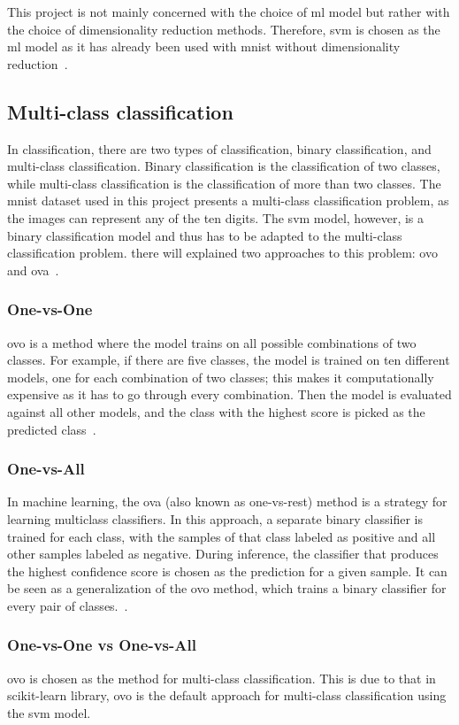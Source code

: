 This project is not mainly concerned with the choice of \gls{ml} model but rather with the choice of dimensionality reduction methods. Therefore, \gls{svm} is chosen as the \gls{ml} model as it has already been used with \gls{mnist} without dimensionality reduction~\cite{lecun-mnist-database}.



\subsection{Multi-class classification}\label{subsec:multi-class}
In classification, there are two types of classification, binary classification, and multi-class classification. Binary classification is the classification of two classes, while multi-class classification is the classification of more than two classes. The \gls{mnist} dataset used in this project presents a multi-class classification problem, as the images can represent any of the ten digits. The \gls{svm} model, however, is a binary classification model and thus has to be adapted to the multi-class classification problem. there will explained two approaches to this problem: \gls{ovo} and \gls{ova}~\cite{james-statistical-learning1}.

\subsubsection{One-vs-One}\label{subsubsec:one-vs-one}
\gls{ovo} is a method where the model trains on all possible combinations of two classes. For example, if there are five classes, the model is trained on ten different models, one for each combination of two classes; this makes it computationally expensive as it has to go through every combination. Then the model is evaluated against all other models, and the class with the highest score is picked as the predicted class~\cite{james-statistical-learning1}.

\subsubsection{One-vs-All}\label{subsubsec:one-vs-all}
In machine learning, the \gls{ova} (also known as one-vs-rest) method is a strategy for learning multiclass classifiers. In this approach, a separate binary classifier is trained for each class, with the samples of that class labeled as positive and all other samples labeled as negative. During inference, the classifier that produces the highest confidence score is chosen as the prediction for a given sample. It can be seen as a generalization of the \gls{ovo} method, which trains a binary classifier for every pair of classes.~\cite{james-statistical-learning1}.

\subsubsection{One-vs-One vs One-vs-All}\label{subsubsec:one-vs-one-vs-one-vs-all}
\gls{ovo} is chosen as the method for multi-class classification. This is due to that in scikit-learn library, \gls{ovo} is the default approach for multi-class classification using the \gls{svm} model. 